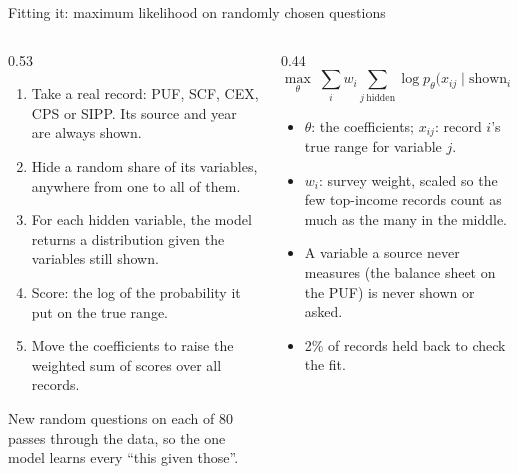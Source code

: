 \documentclass[11pt,aspectratio=169]{beamer}
\begin{document}
\begin{frame}{Fitting it: maximum likelihood on randomly chosen questions}
  \begin{columns}[T]
    \begin{column}{0.53\textwidth}
      \small
      \begin{enumerate}
        \item Take a real record: PUF, SCF, CEX, CPS or SIPP. Its source and year are always shown.
        \item Hide a random share of its variables, anywhere from one to all of them.
        \item For each hidden variable, the model returns a distribution given the
              variables still shown.
        \item Score: the log of the probability it put on the true range.
        \item Move the coefficients to raise the weighted sum of scores over all records.
      \end{enumerate}
      \vspace{0.2em}
      New random questions on each of 80 passes through the data, so the one model learns every ``this given those''.
    \end{column}
    \begin{column}{0.44\textwidth}
      \small
      \[
        \max_{\theta}\; \sum_{i} w_i \!\!\sum_{j\ \text{hidden}}\!\! \log p_\theta\big(x_{ij} \mid \text{shown}_i\big)
      \]
      \vspace{0.2em}
      \begin{itemize}
        \footnotesize
        \item $\theta$: the coefficients; $x_{ij}$: record $i$'s true range for variable $j$.
        \item $w_i$: survey weight, scaled so the few top-income records count as much as the many in the middle.
        \item A variable a source never measures (the balance sheet on the PUF) is never shown or asked.
        \item 2\% of records held back to check the fit.
      \end{itemize}
    \end{column}
  \end{columns}
\end{frame}
\end{document}
